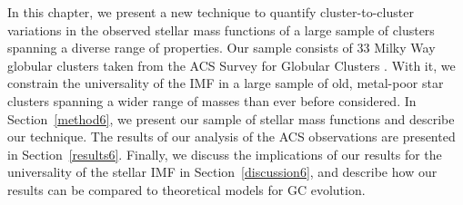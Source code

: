 In this chapter, we present a new technique to quantify
cluster-to-cluster variations 
in the observed stellar mass functions of a large sample of clusters
spanning a diverse range of properties.  
Our sample consists of 33 Milky Way globular clusters taken from the
ACS Survey for Globular Clusters \citep{sarajedini07}.  
With it, we constrain the universality of the IMF in a large
sample of old, metal-poor star 
clusters spanning a wider range of masses than ever before considered.  
In Section~\ref{method6}, we present our sample of stellar mass
functions and describe our technique.  The results of our analysis of
the ACS observations are presented in Section~\ref{results6}.  
Finally, we discuss the implications of our results for the universality of the
stellar IMF in Section~\ref{discussion6}, and describe how our results can be
compared to theoretical models for GC evolution. 


